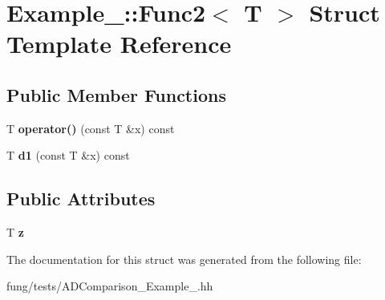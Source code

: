 \hypertarget{structExample__1_1_1Func2}{\section{Example\-\_\-:\-:Func2$<$ T $>$ Struct Template Reference}
\label{structExample__1_1_1Func2}
}
\subsection*{Public Member Functions}
\begin{DoxyCompactItemize}
\item 
\hypertarget{structExample__1_1_1Func2_a33f1a817cee40f7a6997d43ed7a2a91c}{T {\bfseries operator()} (const T \&x) const }\label{structExample__1_1_1Func2_a33f1a817cee40f7a6997d43ed7a2a91c}

\item 
\hypertarget{structExample__1_1_1Func2_a4f5cfde2b1a694eed9092640efc8fd78}{T {\bfseries d1} (const T \&x) const }\label{structExample__1_1_1Func2_a4f5cfde2b1a694eed9092640efc8fd78}

\end{DoxyCompactItemize}
\subsection*{Public Attributes}
\begin{DoxyCompactItemize}
\item 
\hypertarget{structExample__1_1_1Func2_a3ab873482ab8095a46cffad40331266b}{T {\bfseries z}}\label{structExample__1_1_1Func2_a3ab873482ab8095a46cffad40331266b}

\end{DoxyCompactItemize}


The documentation for this struct was generated from the following file\-:\begin{DoxyCompactItemize}
\item 
fung/tests/A\-D\-Comparison\-\_\-\-Example\-\_.\-hh\end{DoxyCompactItemize}
